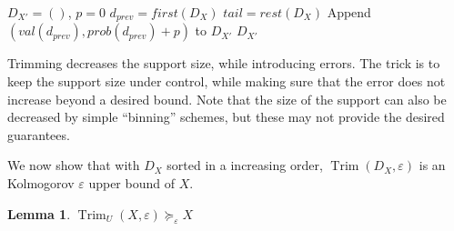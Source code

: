 \documentclass[review]{elsarticle}
\newtheorem{lemma}{Lemma}
\DeclareMathOperator{\support}{support}
\DeclareMathOperator{\Trim}{Trim}
\begin{document}


\begin{algorithm}
  \DontPrintSemicolon
  { 
             $D_{X'}=()$, $p=0$ \;	  
  		$d_{prev} = first(D_X)$\;
                $tail = rest(D_X)$ \;
       		 Append $(val(d_{prev}), prob(d_{prev})+p)$ to  $D_{X'}$\;
  \Return $D_{X'}$}
     
\caption{$\Trim$($D_X$,$\varepsilon$)  }
\label{alg:Trim}
\end{algorithm}

Trimming decreases the support size, while introducing errors. The trick is
to keep the support size under control, while making sure that the error does
not increase beyond a desired bound.
Note that the size of the support can also be
 decreased by simple ``binning'' 
schemes, but these may not provide the desired guarantees.

%

\noindent We now show that with $D_X$ sorted in a increasing order,
$\Trim(D_X,\varepsilon)$ is an Kolmogorov $\varepsilon$ upper bound of $X$.
\begin{lemma} \label{Trim}
$\Trim_U(X,\varepsilon)\succeq_\varepsilon X$
\end{lemma}
\end{document}

